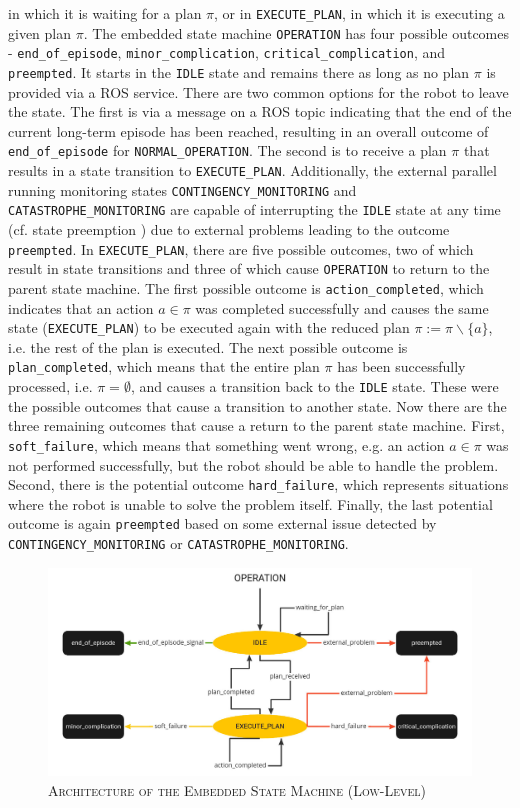 \documentclass[english, master, utf8]{base/thesis_KBS}
\newcommand{\code}[1]{\colorbox{light-gray}{\texttt{#1}}}
\begin{document}
in which it is waiting for a plan $\pi$, or in \code{EXECUTE\_PLAN}, in which it is executing a given plan $\pi$. The embedded state machine \code{OPERATION} has 
four possible outcomes - \code{end\_of\_episode}, \code{minor\_complication}, \code{critical\_complication}, and \code{preempted}. 
It starts in the \code{IDLE} state and remains there as long as no plan $\pi$ is provided via a ROS service.
There are two common options for the robot to leave the state. The first is via a message on a ROS topic indicating that the end of the current long-term episode
has been reached, resulting in an overall outcome of \code{end\_of\_episode} for \code{NORMAL\_OPERATION}. The second is to receive a plan $\pi$ that results in a state
transition to \code{EXECUTE\_PLAN}. Additionally, the external parallel running monitoring states \code{CONTINGENCY\_MONITORING} and \code{CATASTROPHE\_MONITORING}
are capable of interrupting the \code{IDLE} state at any time (cf. state preemption \cite{state_preemption}) due to external problems leading to the outcome \code{preempted}.
In \code{EXECUTE\_PLAN}, there are five possible outcomes, two of which result in state transitions and three of which cause \code{OPERATION} to return to the parent state machine.
The first possible outcome is \code{action\_completed}, which indicates that an action $a \in \pi$  was completed successfully and causes the same state (\code{EXECUTE\_PLAN}) to be
executed again with the reduced plan $\pi := \pi \backslash \{a\}$, i.e. the rest of the plan is executed. The next possible outcome is \code{plan\_completed}, which means that the entire
plan $\pi$ has been successfully processed, i.e. $\pi = \emptyset$, and causes a transition back to the \code{IDLE} state.
These were the possible outcomes that cause a transition to another state. Now there are the three remaining outcomes that cause a return to the parent state machine. 
First, \code{soft\_failure}, which means that something went wrong, e.g. an action $a \in \pi$ was not performed successfully, but the robot should be able to handle the problem. 
Second, there is the potential outcome \code{hard\_failure}, which represents situations where the robot is unable to solve the problem itself.
Finally, the last potential outcome is again \code{preempted} based on some external issue detected by \code{CONTINGENCY\_MONITORING} or \code{CATASTROPHE\_MONITORING}.
\begin{figure}[H]
    \centering
    \includegraphics[width=\textwidth]{pics/SMACH_low_level.jpg}
    \caption{\textsc{Architecture of the Embedded State Machine (Low-Level)}}
    \label{fig:low_level_smach}
\end{figure}
\end{document}
